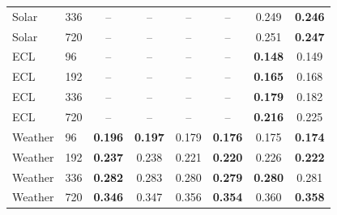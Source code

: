 \begin{tabular}{llcccccc}
Solar & 336 & -- & -- & -- & -- & 0.249 & \textbf{0.246} \\
Solar & 720 & -- & -- & -- & -- & 0.251 & \textbf{0.247} \\
ECL & 96 & -- & -- & -- & -- & \textbf{0.148} & 0.149 \\
ECL & 192 & -- & -- & -- & -- & \textbf{0.165} & 0.168 \\
ECL & 336 & -- & -- & -- & -- & \textbf{0.179} & 0.182 \\
ECL & 720 & -- & -- & -- & -- & \textbf{0.216} & 0.225 \\
Weather & 96 & \textbf{0.196} & \textbf{0.197} & 0.179 & \textbf{0.176} & 0.175 & \textbf{0.174} \\
Weather & 192 & \textbf{0.237} & 0.238 & 0.221 & \textbf{0.220} & 0.226 & \textbf{0.222} \\
Weather & 336 & \textbf{0.282} & 0.283 & 0.280 & \textbf{0.279} & \textbf{0.280} & 0.281 \\
Weather & 720 & \textbf{0.346} & 0.347 & 0.356 & \textbf{0.354} & 0.360 & \textbf{0.358} \\
\bottomrule
\end{tabular}
